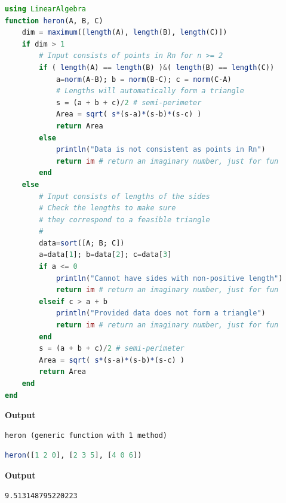 \begin{lstlisting}[language=Julia,style=mystyle]
using LinearAlgebra
function heron(A, B, C)
    dim = maximum([length(A), length(B), length(C)])
    if dim > 1
        # Input consists of points in Rn for n >= 2
        if ( length(A) == length(B) )&( length(B) == length(C))
            a=norm(A-B); b = norm(B-C); c = norm(C-A)
            # Lengths will automatically form a triangle
            s = (a + b + c)/2 # semi-perimeter
            Area = sqrt( s*(s-a)*(s-b)*(s-c) )
            return Area
        else
            println("Data is not consistent as points in Rn")
            return im # return an imaginary number, just for fun
        end
    else
        # Input consists of lengths of the sides
        # Check the lengths to make sure
        # they correspond to a feasible triangle
        #
        data=sort([A; B; C])
        a=data[1]; b=data[2]; c=data[3]
        if a <= 0
            println("Cannot have sides with non-positive length")
            return im # return an imaginary number, just for fun
        elseif c > a + b
            println("Provided data does not form a triangle")
            return im # return an imaginary number, just for fun
        end
        s = (a + b + c)/2 # semi-perimeter
        Area = sqrt( s*(s-a)*(s-b)*(s-c) )
        return Area
    end    
end
\end{lstlisting}
\textbf{Output} 
\begin{verbatim}
heron (generic function with 1 method)
\end{verbatim}


\begin{lstlisting}[language=Julia,style=mystyle]
heron([1 2 0], [2 3 5], [4 0 6])
\end{lstlisting}
\textbf{Output} 
\begin{verbatim}
9.513148795220223
\end{verbatim}








